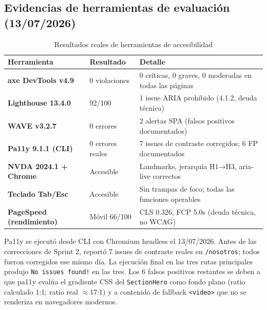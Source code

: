 \documentclass[12pt, a4paper]{article}
\begin{document}
\subsection*{Evidencias de herramientas de evaluación (13/07/2026)}

\begin{table}[H]
\centering
\caption{Resultados reales de herramientas de accesibilidad}
\begin{tabular}{@{}>{\bfseries}p{4.5cm} >{\centering\arraybackslash}p{3.5cm} p{6cm}@{}}
\toprule
\rowcolor{royalblue!12}
\textbf{Herramienta} & \textbf{Resultado} & \textbf{Detalle} \\
\midrule
axe DevTools v4.9 & \textcolor{successgreen}{0 violaciones} & 0 críticas, 0 graves, 0 moderadas en todas las páginas \\
Lighthouse 13.4.0 & \textcolor{warningyellow}{92/100} & 1 issue ARIA prohibido (4.1.2, deuda técnica) \\
WAVE v3.2.7 & \textcolor{successgreen}{0 errores} & 2 alertas SPA (falsos positivos documentados) \\
Pa11y 9.1.1 (CLI) & \textcolor{successgreen}{0 errores reales} & 7 issues de contraste corregidos; 6 FP documentados \\
NVDA 2024.1 + Chrome & \textcolor{successgreen}{Accesible} & Landmarks, jerarquía H1→H3, aria-live correctos \\
Teclado Tab/Esc & \textcolor{successgreen}{Accesible} & Sin trampas de foco; todas las funciones operables \\
PageSpeed (rendimiento) & \textcolor{warningyellow}{Móvil 66/100} & CLS 0.326, FCP 5.0s (deuda técnica, no WCAG) \\
\bottomrule
\end{tabular}
\end{table}

Pa11y se ejecutó desde CLI con Chromium headless el 13/07/2026. Antes de las correcciones de Sprint 2, reportó 7 issues de contraste reales en \texttt{/nosotros}; todos fueron corregidos ese mismo día. La ejecución final en las tres rutas principales produjo \texttt{No issues found!} en las tres. Los 6 falsos positivos restantes se deben a que pa11y evalúa el gradiente CSS del \texttt{SectionHero} como fondo plano (ratio calculado 1:1; ratio real $\approx$17:1) y a contenido de fallback \texttt{<video>} que no se renderiza en navegadores modernos.
\end{document}
